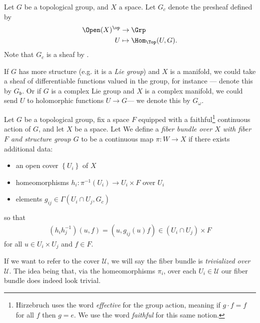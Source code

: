 \documentclass[11pt]{book}
\begin{document}
\begin{notation} 
\label{nota:Gc}
Let $G$ be a topological group, and $X$ a space. Let $G_c$ denote the presheaf defined by
\begin{align*}
    \Open(X)^\op &\to \Grp \\
    U &\mapsto \Hom_{\Top}(U,G).
\end{align*}
Note that $G_c$ is a sheaf by .

If $G$ has more structure (e.g. it is a \emph{Lie group}) and $X$ is a manifold, we could take a sheaf of differentiable functions valued in the group, for instance --- denote this by $G_\mathfrak{b}$. Or if $G$ is a complex Lie group and $X$ is a complex manifold, we could send $U$ to holomorphic functions $U \to G$--- we denote this by $G_\omega$.
\end{notation}

\begin{definition}\label{def:fiber-bundle} 
Let $G$ be a topological group, fix a space $F$ equipped with a faithful\footnote{Hirzebruch uses the word \emph{effective} for the group action, meaning if $g\cdot f = f$ for all $f$ then $g=e$. We use the word \emph{faithful} for this same notion.} continuous action of $G$, and let $X$ be a space. Let  We define a \emph{fiber bundle over $X$ with fiber $F$ and structure group $G$} to be a continuous map $\pi \colon W \to X$ if there exists additional data:
\begin{itemize}
    \item an open cover $\left\{ U_i \right\}$ of $X$
    \item homeomorphisms $h_i \colon \pi^{-1}(U_i) \to U_i \times F$ over $U_i$
    \item elements $g_{ij} \in \Gamma(U_i\cap U_j, G_c)$
\end{itemize}
so that
\begin{align*}
    (h_i h_j^{-1})(u,f) = (u, g_{ij}(u)f) \in (U_i \cap U_j) \times F
\end{align*}
for all $u \in U_i \times U_j$ and $f\in F$.
\end{definition}

\begin{terminology} If we want to refer to the cover $\mathcal{U}$, we will say the fiber bundle is \emph{trivialized over $\mathcal{U}$}. The idea being that, via the homeomorphisms $\pi_i$, over each $U_i \in \mathcal{U}$ our fiber bundle does indeed look trivial.
\end{terminology}
\end{document}
